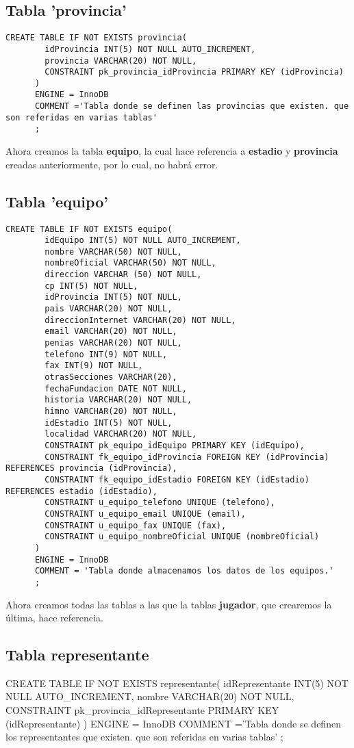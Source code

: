 \documentclass{article}
\begin{document}
   \subsection{Tabla 'provincia'}   
    \begin{lstlisting}[style=C]
      CREATE TABLE IF NOT EXISTS provincia(
        idProvincia INT(5) NOT NULL AUTO_INCREMENT,
        provincia VARCHAR(20) NOT NULL,
        CONSTRAINT pk_provincia_idProvincia PRIMARY KEY (idProvincia)
      )
      ENGINE = InnoDB
      COMMENT ='Tabla donde se definen las provincias que existen. que son referidas en varias tablas'
      ;
    \end{lstlisting}
\newpage
  Ahora creamos la tabla \textbf{equipo}, la cual hace referencia a \textbf{estadio} y \textbf{provincia} creadas 
  anteriormente, por lo cual, no habrá error.
  \subsection{Tabla 'equipo'}
    \begin{lstlisting}[style=C]
      CREATE TABLE IF NOT EXISTS equipo(
        idEquipo INT(5) NOT NULL AUTO_INCREMENT,
        nombre VARCHAR(50) NOT NULL,
        nombreOficial VARCHAR(50) NOT NULL,
        direccion VARCHAR (50) NOT NULL,
        cp INT(5) NOT NULL,
        idProvincia INT(5) NOT NULL,
        pais VARCHAR(20) NOT NULL,
        direccionInternet VARCHAR(20) NOT NULL,
        email VARCHAR(20) NOT NULL,
        penias VARCHAR(20) NOT NULL,
        telefono INT(9) NOT NULL,
        fax INT(9) NOT NULL,
        otrasSecciones VARCHAR(20),
        fechaFundacion DATE NOT NULL,
        historia VARCHAR(20) NOT NULL,
        himno VARCHAR(20) NOT NULL,
        idEstadio INT(5) NOT NULL,
        localidad VARCHAR(20) NOT NULL,
        CONSTRAINT pk_equipo_idEquipo PRIMARY KEY (idEquipo),
        CONSTRAINT fk_equipo_idProvincia FOREIGN KEY (idProvincia) REFERENCES provincia (idProvincia),
        CONSTRAINT fk_equipo_idEstadio FOREIGN KEY (idEstadio) REFERENCES estadio (idEstadio),
        CONSTRAINT u_equipo_telefono UNIQUE (telefono),
        CONSTRAINT u_equipo_email UNIQUE (email),
        CONSTRAINT u_equipo_fax UNIQUE (fax),
        CONSTRAINT u_equipo_nombreOficial UNIQUE (nombreOficial)
      )
      ENGINE = InnoDB
      COMMENT = 'Tabla donde almacenamos los datos de los equipos.'
      ;
    \end{lstlisting}
\newpage
  Ahora creamos todas las tablas a las que la tablas \textbf{jugador}, que crearemos la última, hace referencia.
  \subsection{Tabla representante}  
    \begin{listing}[style=C]
      CREATE TABLE IF NOT EXISTS representante( 
        idRepresentante INT(5) NOT NULL AUTO_INCREMENT,
        nombre VARCHAR(20) NOT NULL,
        CONSTRAINT pk_provincia_idRepresentante PRIMARY KEY (idRepresentante)
      )
      ENGINE = InnoDB
      COMMENT ='Tabla donde se definen los representantes que existen. que son referidas en varias tablas'
      ;
    \end{listing}
\end{document}

